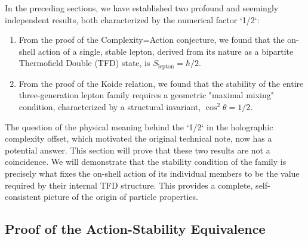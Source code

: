 \documentclass[11pt, letterpaper]{report}
\theoremstyle{plain} %
\theoremstyle{definition} %
\theoremstyle{remark} %
\begin{document}
In the preceding sections, we have established two profound and seemingly independent results, both characterized by the numerical factor `1/2`:
\begin{enumerate}
    \item From the proof of the Complexity=Action conjecture, we found that the on-shell action of a single, stable lepton, derived from its nature as a bipartite Thermofield Double (TFD) state, is $S_{\text{lepton}} = \hbar/2$.
    \item From the proof of the Koide relation, we found that the stability of the entire three-generation lepton family requires a geometric "maximal mixing" condition, characterized by a structural invariant, $\cos^2\theta = 1/2$.
\end{enumerate}
The question of the physical meaning behind the `1/2` in the holographic complexity offset, which motivated the original technical note, now has a potential answer. This section will prove that these two results are not a coincidence. We will demonstrate that the stability condition of the family is precisely what fixes the on-shell action of its individual members to be the value required by their internal TFD structure. This provides a complete, self-consistent picture of the origin of particle properties.

\subsection{Proof of the Action-Stability Equivalence}
\end{document}
